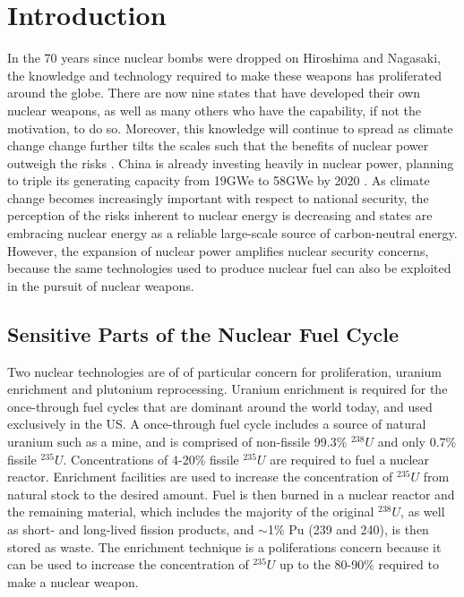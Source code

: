 \section{Introduction}
\label{s_motive}

In the 70 years since nuclear bombs were dropped on Hiroshima and Nagasaki, the knowledge and technology required to make these weapons has proliferated around the globe. There are now nine states that have developed their own nuclear weapons, as well as many others who have the capability, if not the motivation, to do so\cite{feiveson_unmaking_2014}.  Moreover, this knowledge will continue to spread as climate change change further tilts the scales such that the benefits of nuclear power outweigh the risks \cite{mooney_why_2014}.  China is already investing heavily in nuclear power, planning to triple its generating capacity from 19GWe to 58GWe by 2020  \cite{_china_2014}.  As climate change becomes increasingly important with respect to national security, the perception of the risks inherent to nuclear energy is decreasing and states are embracing nuclear energy as a reliable large-scale source of carbon-neutral energy.  However, the expansion of nuclear power amplifies nuclear security concerns, because the same technologies used to produce nuclear fuel can also be exploited in the pursuit of nuclear weapons.


\subsection{Sensitive Parts of the Nuclear Fuel Cycle}

Two nuclear technologies are of of particular concern for proliferation, uranium enrichment and plutonium reprocessing.  Uranium enrichment is required for the once-through fuel cycles that are dominant around the world today, and used exclusively in the \gls{US}.  A once-through fuel cycle includes a source of natural uranium such as a mine, and is comprised of non-fissile 99.3\% $^{238}U$ and only 0.7\% fissile $^{235}U$. Concentrations of 4-20\% fissile $^{235}U$ are required to fuel a nuclear reactor. Enrichment facilities are used to increase the concentration of $^{235}U$ from natural stock to the desired amount.  Fuel is then burned in a nuclear reactor and the remaining material, which includes the majority of the original $^{238}U$, as well as short- and long-lived fission products, and $\sim$1\% Pu (239 and 240), is then stored as waste.  The enrichment technique is a poliferations concern because it can be used to increase the concentration of $^{235}U$ up to the 80-90\% required to make a nuclear weapon\cite{_military_2014}.

